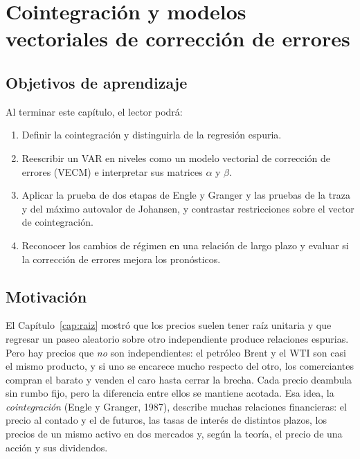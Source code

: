 \chapter[Cointegración y VECM]{Cointegración y modelos vectoriales de corrección de errores}\label{cap:cointegracion}

\section*{Objetivos de aprendizaje}
Al terminar este capítulo, el lector podrá:
\begin{enumerate}[label=\arabic*.,leftmargin=*]
  \item Definir la cointegración y distinguirla de la regresión espuria.
  \item Reescribir un VAR en niveles como un modelo vectorial de corrección de errores (VECM) e interpretar sus
        matrices $\alpha$ y $\beta$.
  \item Aplicar la prueba de dos etapas de Engle y Granger y las pruebas de la traza y del máximo autovalor de
        Johansen, y contrastar restricciones sobre el vector de cointegración.
  \item Reconocer los cambios de régimen en una relación de largo plazo y evaluar si la corrección de errores
        mejora los pronósticos.
\end{enumerate}

\section*{Motivación}
El Capítulo~\ref{cap:raiz} mostró que los precios suelen tener raíz unitaria y que regresar un paseo aleatorio
sobre otro independiente produce relaciones espurias. Pero hay precios que \emph{no} son independientes: el
petróleo Brent y el WTI son casi el mismo producto, y si uno se encarece mucho respecto del otro, los
comerciantes compran el barato y venden el caro hasta cerrar la brecha. Cada precio deambula sin rumbo fijo,
pero la diferencia entre ellos se mantiene acotada. Esa idea, la \emph{cointegración} (Engle y Granger, 1987),
describe muchas relaciones financieras: el precio al contado y el de futuros, las tasas de interés de distintos
plazos, los precios de un mismo activo en dos mercados y, según la teoría, el precio de una acción y sus
dividendos.

